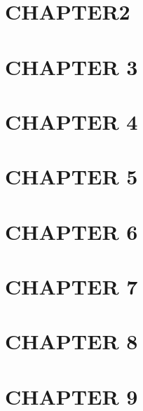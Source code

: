 



\cite{holmessmith3234}

\chapter{CHAPTER2}

\chapter{CHAPTER 3}


\chapter{CHAPTER 4}

\chapter{CHAPTER 5}


\chapter{CHAPTER 6}


\chapter{CHAPTER 7}


\chapter{CHAPTER 8}


\chapter{CHAPTER 9}



